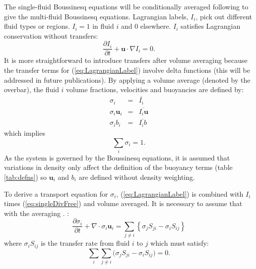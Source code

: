 \documentclass[draft]{agujournal2019}
\begin{document}
The single-fluid Boussinesq equations will be conditionally averaged following  to give the multi-fluid Boussinesq equations. Lagrangian labels, $I_i$, pick out different fluid types or regions. $I_i=1$ in fluid $i$ and 0 elsewhere. $I_i$ satisfies Lagrangian conservation without transfers:
\begin{equation}
\frac{\partial I_i}{\partial t} + \mathbf{u}\cdot\nabla I_i = 0.
\label{eq:LagrangianLabel}
\end{equation}
It is more straightforward to introduce transfers after volume averaging because the transfer terms for (\ref{eq:LagrangianLabel}) involve delta functions (this will be addressed in future publications). 
By applying a volume average (denoted by the overbar), the fluid $i$ volume fractions, velocities and buoyancies are defined by:
\begin{eqnarray}
\sigma_i &=& \overline{I_i} \\
\sigma_i \mathbf{u}_i &=& \overline{I_i \mathbf{u}} \\
\sigma_i b_i &=& \overline{I_i b}
\label{eq:defineFluidFields}
\end{eqnarray}
which implies
\begin{equation}
\sum_{i}\sigma_{i}  =  1.
\label{eq:sumOne}
\end{equation}
As the system is governed by the Boussinesq equations, it is assumed that variations in density only affect the definition of the buoyancy terms (table \protect\ref{tab:defns}) so $\mathbf{u}_i$ and $b_i$ are defined without density weighting. 

To derive a transport equation for $\sigma_i$, (\ref{eq:LagrangianLabel}) is combined with $I_i$ times (\ref{eq:singleDivFree}) and volume averaged. 
It is necessary to assume that  with the averaging \cite<as described by>{TWV+18}. :
\begin{equation}
\frac{\partial\sigma_{i}}{\partial t}+\nabla\cdot\sigma_{i}\mathbf{u}_{i}  =  \sum_{j\ne i}\left\{ \sigma_{j}S_{ji}-\sigma_{i}S_{ij}\right\}
\label{eq:sigma}
\end{equation}
where $\sigma_{i}S_{ij}$ is the transfer rate from fluid $i$ to $j$ which must satisfy:
\begin{equation}
\sum_i \sum_{j\ne i} \bigl( \sigma_j S_{ji} - \sigma_i S_{ij} \bigr) =0.
\end{equation}
\end{document}
